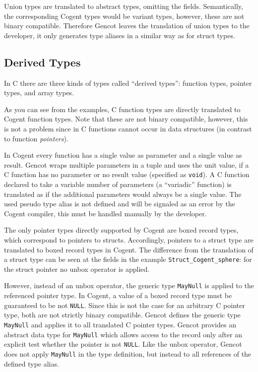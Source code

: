 \documentclass[a4paper]{report}
\newcommand{\code}[1]{\textnormal{\texttt{#1}}}
\begin{document}
Union types are translated to abstract types, omitting the fields. Semantically, the corresponding Cogent types would
be variant types, however, these are not binary compatible. Therefore Gencot leaves the translation of union types to
the developer, it only generates type aliases in a similar way as for struct types.

\subsection{Derived Types}
\label{types-auto-derived}

In C there are three kinds of types called ``derived types'': function types, pointer types, and array types.

As you can see from the examples, C function types are directly translated to Cogent function types. Note that these
are not binary compatible, however, this is not a problem since in C functions cannot occur in data structures (in
contrast to function \textit{pointers}).

In Cogent every function has a single value as parameter and a single value as result. Gencot wraps multiple parameters
in a tuple and uses the unit value, if a C function has no parameter or no result value (specified as \code{void}).
A C function declared to take a variable number of parameters (a ``variadic'' function) is translated as if the 
additional parameters would always be a single value. The used pseudo type alias is not defined and will be signaled
as an error by the Cogent compiler, this must be handled manually by the developer.

The only pointer types directly supported by Cogent are boxed record types, which correspond to pointers to structs.
Accordingly, pointers to a struct type are translated to boxed record types in Cogent. The difference from the translation
of a struct type can be seen at the fields in the example \code{Struct\_Cogent\_sphere}: for the struct pointer no
unbox operator is applied. 

However, instead of an unbox operator, the generic type \code{MayNull} is applied to the referenced pointer type. In 
Cogent, a value of a boxed record type must be guaranteed to be not \code{NULL}. Since this is not the case for an 
arbitrary C pointer type, both are not strictly binary compatible. Gencot defines the generic type \code{MayNull}
and applies it to all translated C pointer types. Gencot provides an abstract data type for \code{MayNull} which allows
access to the record only after an explicit test whether the pointer is not \code{NULL}. Like the unbox operator,
Gencot does not apply \code{MayNull} in the type definition, but instead to all references of the defined type alias.
\end{document}
